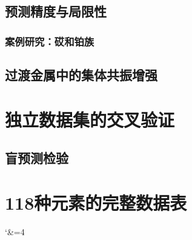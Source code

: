 \documentclass[11pt,a4paper]{article}
\begin{document}
	\subsection{预测精度与局限性}
	\subsubsection{案例研究：砹和铂族}
	\subsection{过渡金属中的集体共振增强}
	\label{sec:resonance}
	
	\section{独立数据集的交叉验证}
	\subsection{盲预测检验}
	
	\section{118种元素的完整数据表}
	\label{sec:full_data_table}
	
	\begingroup
	\catcode`\&=4\relax
	
\end{document}
